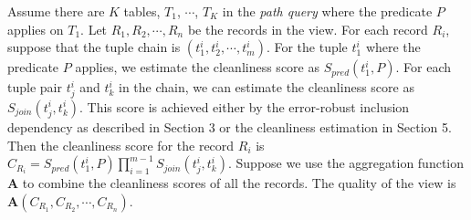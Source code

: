 Assume there are $K$ tables, $T_1$, $\cdots$, $T_K$ in the \emph{path query} where the predicate $P$ applies on $T_1$. Let $R_1, R_2, \cdots, R_n$ be the records in the view. For each record $R_i$, suppose that the tuple chain is $(t^i_1, t^i_2, \cdots, t^i_m)$. For the tuple $t^i_1$ where the predicate $P$ applies, we estimate the cleanliness score as $S_{pred}(t^i_1, P)$. For each tuple pair $t^i_j$ and $t^i_k$ in the chain, we can estimate the cleanliness score as $S_{join}(t^i_j,t^i_k)$. This score is achieved either by the error-robust inclusion dependency as described in Section 3 or the cleanliness estimation in Section 5. Then the cleanliness score for the record $R_i$ is $C_{R_i}=S_{pred}(t^i_1,P)\prod_{i=1}^{m-1}S_{join}(t^i_j,t^i_k)$. Suppose we use the aggregation function $\mathbf{A}$ to combine the cleanliness scores of all the records. The quality of the view is $\mathbf{A}(C_{R_1}, C_{R_2}, \cdots, C_{R_n})$.


\fi



